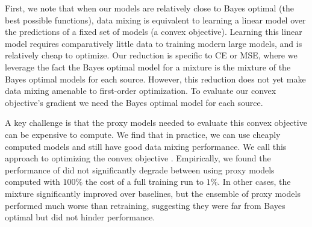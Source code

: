 First, we note that when our models are relatively close to Bayes optimal (the best possible functions), data mixing is equivalent to learning a linear model over the predictions of a fixed set of models (a convex objective). Learning this linear model requires comparatively little data to training modern large models, and is relatively cheap to optimize. Our reduction is specific to CE or MSE, where we leverage the fact the Bayes optimal model for a mixture is the mixture of the Bayes optimal models for each source. However, this reduction does not yet make data mixing amenable to first-order optimization. To evaluate our convex objective's gradient we need the Bayes optimal model for each source.





A key challenge is that the proxy models needed to evaluate this convex objective can be expensive to compute. We find that in practice, we can use cheaply computed models and still have good data mixing performance. We call this approach to optimizing the convex objective \emph{\methodnospace}. Empirically, we found the performance of \method did not significantly degrade between using proxy models computed with $100\%$ the cost of a full training run to $1\%$. In other cases, the \method mixture significantly improved over baselines, but the ensemble of proxy models performed much worse than retraining, suggesting they were far from Bayes optimal but did not hinder \method performance.









